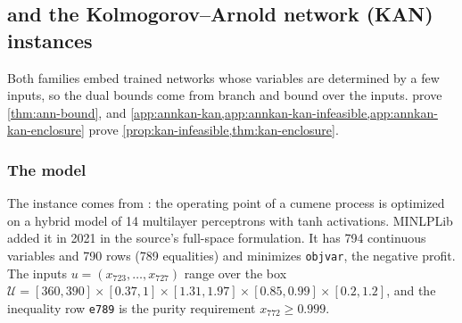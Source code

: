 \subsection{ and the Kolmogorov--Arnold network (KAN) instances}\label{app:annkan}

Both families embed trained networks whose variables are determined by a few inputs, so the dual bounds come from branch and bound over the inputs.
 prove \cref{thm:ann-bound}, and \cref{app:annkan-kan,app:annkan-kan-infeasible,app:annkan-kan-enclosure} prove \cref{prop:kan-infeasible,thm:kan-enclosure}.

\subsubsection{The model \texorpdfstring{}{ann\_cumene\_tanh}}\label{app:annkan-ann}

The instance comes from \citet[Section~5.4]{schweidtmann2019-deterministic-global-optimization-with-artificial}: the operating point of a cumene process is optimized on a hybrid model of 14 multilayer perceptrons with tanh activations.
MINLPLib added it in 2021 in the source's full-space formulation.
It has 794 continuous variables and 790 rows (789 equalities) and minimizes \texttt{objvar}, the negative profit.
The inputs $u=(x_{723},\dots,x_{727})$ range over the box $\mathcal U=[360,390]\times[0.37,1]\times[1.31,1.97]\times[0.85,0.99]\times[0.2,1.2]$, and the inequality row \texttt{e789} is the purity requirement $x_{772}\ge0.999$.

